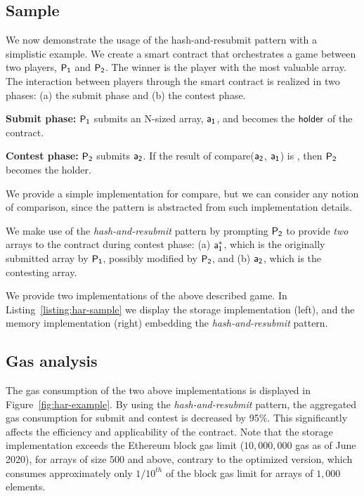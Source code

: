 \subsection{Sample} We now demonstrate the usage of the
hash-and-resubmit pattern with a simplistic example. We create a smart contract
that orchestrates a game between two players, $\mathsf{P_1}$ and $\mathsf{P_2}$. The winner is
the player with the most valuable array. The interaction between players
through the smart contract is realized in two phases: (a) the submit phase and
(b) the contest phase.

\noindent\textbf{Submit phase:} $\mathsf{P_1}$ submits an N-sized array, $\mathsf{a_1}$, and
becomes the $\mathsf{holder}$ of the contract.

\noindent\textbf{Contest phase:} $\mathsf{P_2}$ submits $\mathsf{a_2}$. If the result of
\textsf{compare}($\mathsf{a_2}$, $\mathsf{a_1}$) is \true, then $\mathsf{P_2}$ becomes the holder.

% 

We provide a simple implementation for \textsf{compare}, but we can consider
any notion of comparison, since the pattern is abstracted from such
implementation details.

We make use of the \emph{hash-and-resubmit} pattern by prompting $\mathsf{P_2}$ to
provide \emph{two} arrays to the contract during contest phase: (a) $\mathsf{a_1^*}$,
which is the originally submitted array by $\mathsf{P_1}$, possibly modified by $\mathsf{P_2}$,
and (b) $\mathsf{a_2}$, which is the contesting array.

We provide two implementations of the above described game.  In
Listing~\ref{listing:har-sample} we display the storage implementation (left),
and the memory implementation (right) embedding the \emph{hash-and-resubmit}
pattern.



\subsection{Gas analysis} The gas consumption of the two above
implementations is displayed in Figure~\ref{fig:har-example}. By using the
\emph{hash-and-resubmit} pattern, the aggregated gas consumption for
\textsf{submit} and \textsf{contest} is decreased by 95\%. This significantly
affects the efficiency and applicability of the contract. Note that the storage
implementation exceeds the Ethereum block gas limit ($10{,}000{,}000$ gas as of
June 2020), for arrays of size 500 and above, contrary to the optimized
version, which consumes approximately only $1/10^{th}$ of the block gas limit
for arrays of $1{,}000$ elements.

